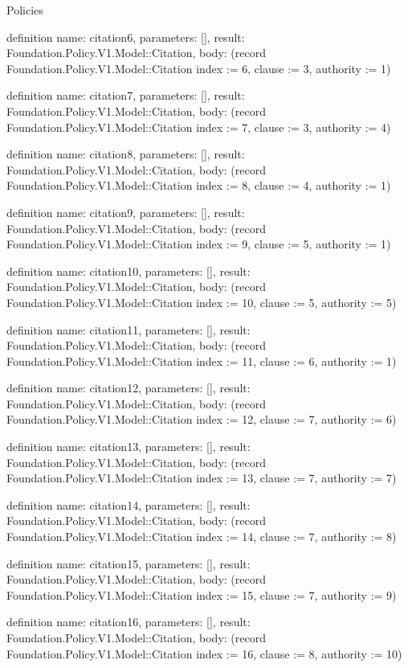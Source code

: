 \begin{lexlean}{Policies}
\begin{semanticmodule}
definition{
  name: citation6,
  parameters: [],
  result: Foundation.Policy.V1.Model::Citation,
  body: (record Foundation.Policy.V1.Model::Citation {index := 6, clause := 3, authority := 1})
}

definition{
  name: citation7,
  parameters: [],
  result: Foundation.Policy.V1.Model::Citation,
  body: (record Foundation.Policy.V1.Model::Citation {index := 7, clause := 3, authority := 4})
}

definition{
  name: citation8,
  parameters: [],
  result: Foundation.Policy.V1.Model::Citation,
  body: (record Foundation.Policy.V1.Model::Citation {index := 8, clause := 4, authority := 1})
}

definition{
  name: citation9,
  parameters: [],
  result: Foundation.Policy.V1.Model::Citation,
  body: (record Foundation.Policy.V1.Model::Citation {index := 9, clause := 5, authority := 1})
}

definition{
  name: citation10,
  parameters: [],
  result: Foundation.Policy.V1.Model::Citation,
  body: (record Foundation.Policy.V1.Model::Citation {index := 10, clause := 5, authority := 5})
}

definition{
  name: citation11,
  parameters: [],
  result: Foundation.Policy.V1.Model::Citation,
  body: (record Foundation.Policy.V1.Model::Citation {index := 11, clause := 6, authority := 1})
}

definition{
  name: citation12,
  parameters: [],
  result: Foundation.Policy.V1.Model::Citation,
  body: (record Foundation.Policy.V1.Model::Citation {index := 12, clause := 7, authority := 6})
}

definition{
  name: citation13,
  parameters: [],
  result: Foundation.Policy.V1.Model::Citation,
  body: (record Foundation.Policy.V1.Model::Citation {index := 13, clause := 7, authority := 7})
}

definition{
  name: citation14,
  parameters: [],
  result: Foundation.Policy.V1.Model::Citation,
  body: (record Foundation.Policy.V1.Model::Citation {index := 14, clause := 7, authority := 8})
}

definition{
  name: citation15,
  parameters: [],
  result: Foundation.Policy.V1.Model::Citation,
  body: (record Foundation.Policy.V1.Model::Citation {index := 15, clause := 7, authority := 9})
}

definition{
  name: citation16,
  parameters: [],
  result: Foundation.Policy.V1.Model::Citation,
  body: (record Foundation.Policy.V1.Model::Citation {index := 16, clause := 8, authority := 10})
}


\end{semanticmodule}
\end{lexlean}
